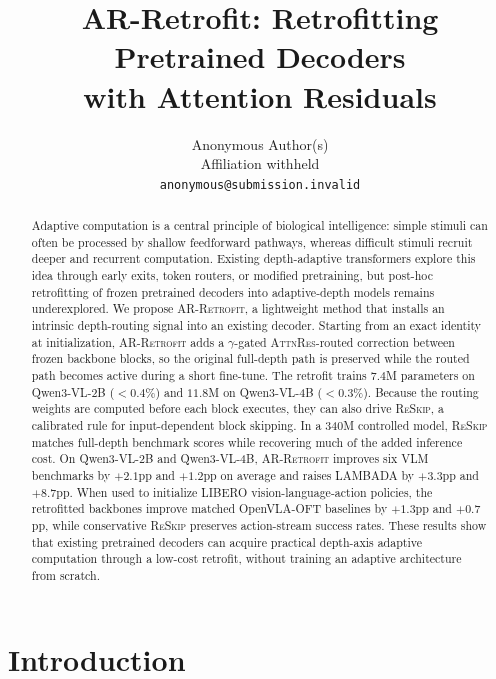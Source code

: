 \documentclass{article}
\title{AR-Retrofit: Retrofitting Pretrained Decoders\\with Attention Residuals}
\author{
  Anonymous Author(s) \\
  Affiliation withheld \\
  \texttt{anonymous@submission.invalid}
}
\newcommand{\attnres}{\textsc{AttnRes}}
\newcommand{\reskip}{\textsc{ReSkip}}
\newcommand{\retrofit}{\textsc{AR-Retrofit}}
\begin{document}
\maketitle

\begin{abstract}
Adaptive computation is a central principle of biological intelligence: simple stimuli can often be processed by shallow feedforward pathways, whereas difficult stimuli recruit deeper and recurrent computation. Existing depth-adaptive transformers explore this idea through early exits, token routers, or modified pretraining, but post-hoc retrofitting of frozen pretrained decoders into adaptive-depth models remains underexplored. We propose \retrofit{}, a lightweight method that installs an intrinsic depth-routing signal into an existing decoder. Starting from an exact identity at initialization, \retrofit{} adds a $\gamma$-gated \attnres{}-routed correction between frozen backbone blocks, so the original full-depth path is preserved while the routed path becomes active during a short fine-tune. The retrofit trains $7.4$M parameters on Qwen3-VL-2B ($<0.4\%$) and $11.8$M on Qwen3-VL-4B ($<0.3\%$). Because the routing weights are computed before each block executes, they can also drive \reskip{}, a calibrated rule for input-dependent block skipping. In a 340M controlled model, \reskip{} matches full-depth benchmark scores while recovering much of the added inference cost. On Qwen3-VL-2B and Qwen3-VL-4B, \retrofit{} improves six VLM benchmarks by $+2.1$pp and $+1.2$pp on average and raises LAMBADA by $+3.3$pp and $+8.7$pp. When used to initialize LIBERO vision-language-action policies, the retrofitted backbones improve matched OpenVLA-OFT baselines by $+1.3$pp and $+0.7$pp, while conservative \reskip{} preserves action-stream success rates. These results show that existing pretrained decoders can acquire practical depth-axis adaptive computation through a low-cost retrofit, without training an adaptive architecture from scratch.
\end{abstract}

\section{Introduction}
\label{sec:intro}
\end{document}
